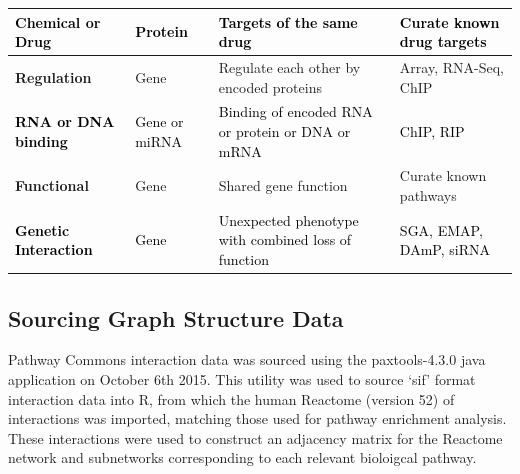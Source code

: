 \begin{flushleft}
\begin{supertabular}{m{4.0490003cm}|m{2.55cm}|m{4.301cm}|m{4.201cm}}
{\fontsize{10pt}{12.0pt}\selectfont \textcolor{black}{Chemical or
Drug}} &
\color{black}
{\fontsize{10pt}{12.0pt}\selectfont \textcolor{black}{Protein}} &
\color{black}
{\fontsize{10pt}{12.0pt}\selectfont \textcolor{black}{Targets of the
same drug}} &
\color{black}
{\fontsize{10pt}{12.0pt}\selectfont \textcolor{black}{Curate known drug
targets}}\\\hline
\bfseries {\fontsize{10pt}{12.0pt}\selectfont Regulation} &
{\fontsize{10pt}{12.0pt}\selectfont Gene} &
{\fontsize{10pt}{12.0pt}\selectfont Regulate each other by encoded
proteins} &
{\fontsize{10pt}{12.0pt}\selectfont Array, RNA-Seq, ChIP}\\\hline
{}\bfseries\color{black}
{\fontsize{10pt}{12.0pt}\selectfont \textcolor{black}{RNA or DNA
binding}} &
\color{black}
{\fontsize{10pt}{12.0pt}\selectfont \textcolor{black}{Gene or miRNA}} &
\color{black}
{\fontsize{10pt}{12.0pt}\selectfont \textcolor{black}{Binding of
encoded RNA or protein or DNA or mRNA}} &
\color{black}
{\fontsize{10pt}{12.0pt}\selectfont \textcolor{black}{ChIP,
RIP}}\\\hline
\bfseries {\fontsize{10pt}{12.0pt}\selectfont Functional} &
{\fontsize{10pt}{12.0pt}\selectfont Gene} &
{\fontsize{10pt}{12.0pt}\selectfont Shared gene function} &
{\fontsize{10pt}{12.0pt}\selectfont Curate known pathways}\\\hline
{}\bfseries\color{black}
{\fontsize{10pt}{12.0pt}\selectfont \textcolor{black}{Genetic
Interaction}} &
\color{black}
{\fontsize{10pt}{12.0pt}\selectfont \textcolor{black}{Gene}} &
\color{black}
{\fontsize{10pt}{12.0pt}\selectfont \textcolor{black}{Unexpected
phenotype with combined loss of function}} &
\color{black}
{\fontsize{10pt}{12.0pt}\selectfont \textcolor{black}{SGA, EMAP, DAmP,
siRNA}}\\\hline
\end{supertabular}
\end{flushleft}

\fi

\subsection{Sourcing Graph Structure Data}
Pathway Commons interaction data was sourced using the paxtools-4.3.0 java application on October 6th 2015. This utility was used to source `sif' format interaction data into R, from which the human Reactome (version 52) of interactions was imported, matching those used for pathway enrichment analysis. These interactions were used to construct an adjacency matrix for the Reactome network and subnetworks corresponding to each relevant bioloigcal pathway. 

